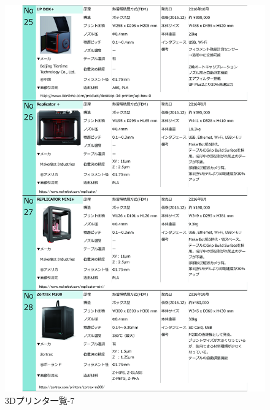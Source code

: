 \begin{figure}[htbp]
\centering
\includegraphics[width=380pt]{fig/fig30_cmyk.jpg}
\caption{3Dプリンタ一覧-7}
\label{fig30}
\end{figure}
